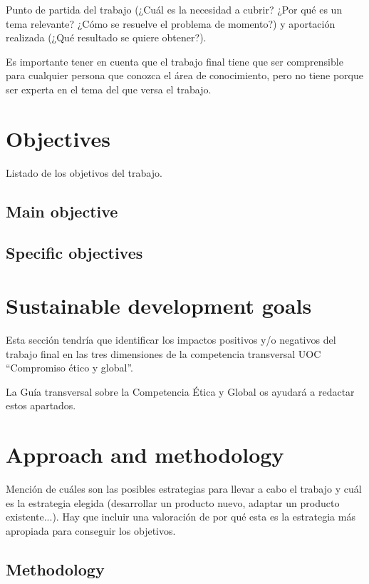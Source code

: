 \documentclass[ENG, BIB]{TFUOC}%
\begin{document}
Punto de partida del trabajo (¿Cuál es la necesidad a cubrir? ¿Por qué es un tema relevante? ¿Cómo se resuelve el problema de momento?) y aportación realizada (¿Qué resultado se quiere obtener?).

Es importante tener en cuenta que el trabajo final tiene que ser comprensible para cualquier persona que conozca el área de conocimiento, pero no tiene porque ser experta en el tema del que versa el trabajo.

\chapter{Objectives}

Listado de los objetivos del trabajo.

\section{Main objective}

\section{Specific objectives}


\chapter{Sustainable development goals}
\label{s:etic}

Esta sección tendría que identificar los impactos positivos y/o negativos del trabajo final en las tres dimensiones de la competencia transversal UOC “Compromiso ético y global”.
 
La Guía transversal sobre la Competencia Ética y Global os ayudará a redactar estos apartados.

\chapter{Approach and methodology}
Mención de cuáles son las posibles estrategias para llevar a cabo el trabajo y cuál es la estrategia elegida (desarrollar un producto nuevo, adaptar un producto existente...). Hay que incluir una valoración de por qué esta es la estrategia más apropiada para conseguir los objetivos.   	

\section{Methodology}
\end{document}
